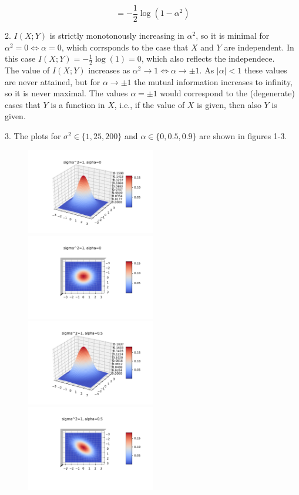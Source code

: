 \documentclass[english]{exercisesheet}
\begin{document}
\begin{solution}
\begin{equation*}
 \end{equation*}
 \begin{equation*}
 =-\frac{1}{2}\log(1-\alpha^2)
\end{equation*}
\par2. $I(X;Y)$ is strictly monotonously increasing in $\alpha^2$, so it is minimal for $\alpha^2=0\Leftrightarrow \alpha=0$, which corrsponds to the case that $X$ and $Y$ are independent. In this case $I(X;Y)=-\frac{1}{2}\log(1)=0$, which also reflects the independece.\\
The value of $I(X;Y)$ increases as $\alpha^2 \rightarrow 1 \Leftrightarrow \alpha \rightarrow \pm 1$. As $|\alpha|<1$ these values are never attained, but for $\alpha \rightarrow \pm 1$ the mutual information increases to infinity, so it is never maximal. The values $\alpha=\pm1$ would correspond to the (degenerate) cases that $Y$ is a function in $X$, i.e., if the value of $X$ is given, then also $Y$ is given.
\par3. The plots for $\sigma^2\in \lbrace 1,25,200\rbrace$ and $\alpha\in\lbrace 0, 0.5,0.9\rbrace$ are shown in figures 1-3.
\begin{figure}
 \includegraphics[width=0.5\textwidth]{images/plot-1-0-side.pdf} \includegraphics[width=0.5\textwidth]{images/plot-1-0-top.pdf}\\
 \includegraphics[width=0.5\textwidth]{images/plot-1-5-side.pdf} \includegraphics[width=0.5\textwidth]{images/plot-1-5-top.pdf}\\

\end{figure}
\end{solution}
\end{document}
